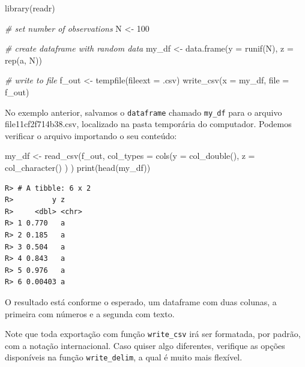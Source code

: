 \documentclass[
  11pt,
]{book}
\newenvironment{Shaded}{\begin{snugshade}}{\end{snugshade}}
\newcommand{\AttributeTok}[1]{\textcolor[rgb]{0.61,0.61,0.61}{#1}}
\newcommand{\CommentTok}[1]{\textcolor[rgb]{0.37,0.37,0.37}{\textit{#1}}}
\newcommand{\DecValTok}[1]{\textcolor[rgb]{0.06,0.06,0.06}{#1}}
\newcommand{\FunctionTok}[1]{\textcolor[rgb]{0,0,0}{#1}}
\newcommand{\NormalTok}[1]{#1}
\newcommand{\OtherTok}[1]{\textcolor[rgb]{0.37,0.37,0.37}{#1}}
\newcommand{\StringTok}[1]{\textcolor[rgb]{0.5,0.5,0.5}{#1}}
\begin{document}
\begin{Shaded}
\begin{Highlighting}[]
\FunctionTok{library}\NormalTok{(readr)}

\CommentTok{\# set number of observations}
\NormalTok{N }\OtherTok{\textless{}{-}} \DecValTok{100}

\CommentTok{\# create dataframe with random data}
\NormalTok{my\_df }\OtherTok{\textless{}{-}} \FunctionTok{data.frame}\NormalTok{(}\AttributeTok{y =} \FunctionTok{runif}\NormalTok{(N),}
                    \AttributeTok{z =} \FunctionTok{rep}\NormalTok{(}\StringTok{\textquotesingle{}a\textquotesingle{}}\NormalTok{, N))}

\CommentTok{\# write to file}
\NormalTok{f\_out }\OtherTok{\textless{}{-}} \FunctionTok{tempfile}\NormalTok{(}\AttributeTok{fileext =} \StringTok{\textquotesingle{}.csv\textquotesingle{}}\NormalTok{)}
\FunctionTok{write\_csv}\NormalTok{(}\AttributeTok{x =}\NormalTok{ my\_df, }\AttributeTok{file =}\NormalTok{ f\_out)}
\end{Highlighting}
\end{Shaded}

No exemplo anterior, salvamos o \texttt{dataframe} chamado \texttt{my\_df} para o arquivo file11cf2f714b38.csv, localizado na pasta temporária do computador. Podemos verificar o arquivo importando o seu conteúdo:

\begin{Shaded}
\begin{Highlighting}[]
\NormalTok{my\_df }\OtherTok{\textless{}{-}} \FunctionTok{read\_csv}\NormalTok{(f\_out,}
                  \AttributeTok{col\_types =} \FunctionTok{cols}\NormalTok{(}\AttributeTok{y =} \FunctionTok{col\_double}\NormalTok{(),}
                                   \AttributeTok{z =} \FunctionTok{col\_character}\NormalTok{() ) )}
\FunctionTok{print}\NormalTok{(}\FunctionTok{head}\NormalTok{(my\_df))}
\end{Highlighting}
\end{Shaded}

\begin{verbatim}
R> # A tibble: 6 x 2
R>         y z    
R>     <dbl> <chr>
R> 1 0.770   a    
R> 2 0.185   a    
R> 3 0.504   a    
R> 4 0.843   a    
R> 5 0.976   a    
R> 6 0.00403 a
\end{verbatim}

O resultado está conforme o esperado, um dataframe com duas colunas, a primeira com números e a segunda com texto.

Note que toda exportação com função \texttt{write\_csv} irá ser formatada, por padrão, com a notação internacional. Caso quiser algo diferentes, verifique as opções disponíveis na função \texttt{write\_delim}, a qual é muito mais flexível.
\end{document}
